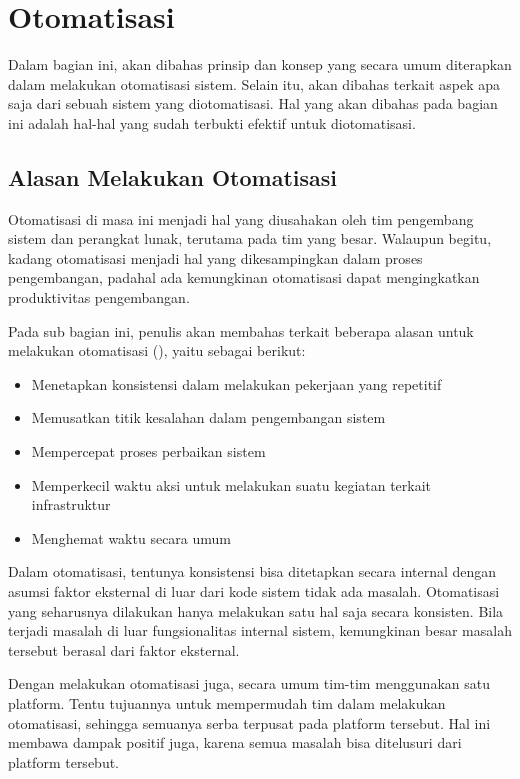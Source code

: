 \section{Otomatisasi}\label{automation}

Dalam bagian ini, akan dibahas prinsip dan konsep yang secara umum diterapkan dalam melakukan otomatisasi sistem.
Selain itu, akan dibahas terkait aspek apa saja dari sebuah sistem yang diotomatisasi.
Hal yang akan dibahas pada bagian ini adalah hal-hal yang sudah terbukti efektif untuk diotomatisasi.

\subsection{Alasan Melakukan Otomatisasi}
Otomatisasi di masa ini menjadi hal yang diusahakan oleh tim pengembang sistem dan perangkat lunak, terutama pada tim yang besar.
Walaupun begitu, kadang otomatisasi menjadi hal yang dikesampingkan dalam proses pengembangan, padahal ada kemungkinan otomatisasi dapat mengingkatkan produktivitas pengembangan.

Pada sub bagian ini, penulis akan membahas terkait beberapa alasan untuk melakukan otomatisasi (\cite{beyer2016site}), yaitu sebagai berikut:

\begin{itemize}
  \item Menetapkan konsistensi dalam melakukan pekerjaan yang repetitif
  \item Memusatkan titik kesalahan dalam pengembangan sistem
  \item Mempercepat proses perbaikan sistem
  \item Memperkecil waktu aksi untuk melakukan suatu kegiatan terkait infrastruktur
  \item Menghemat waktu secara umum
\end{itemize}

Dalam otomatisasi, tentunya konsistensi bisa ditetapkan secara internal dengan asumsi faktor eksternal di luar dari kode sistem tidak ada masalah.
Otomatisasi yang seharusnya dilakukan hanya melakukan satu hal saja secara konsisten.
Bila terjadi masalah di luar fungsionalitas internal sistem, kemungkinan besar masalah tersebut berasal dari faktor eksternal.

Dengan melakukan otomatisasi juga, secara umum tim-tim menggunakan satu platform.
Tentu tujuannya untuk mempermudah tim dalam melakukan otomatisasi, sehingga semuanya serba terpusat pada platform tersebut.
Hal ini membawa dampak positif juga, karena semua masalah bisa ditelusuri dari platform tersebut.

